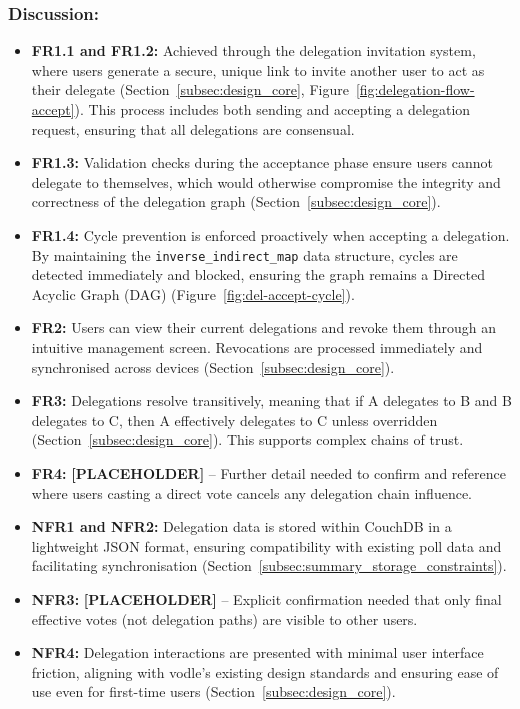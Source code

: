 \subsubsection{Discussion:}

\begin{itemize}
    \item \textbf{FR1.1 and FR1.2:} Achieved through the delegation invitation system, where users generate a secure, unique link to invite another user to act as their delegate (Section~\ref{subsec:design_core}, Figure~\ref{fig:delegation-flow-accept}). This process includes both sending and accepting a delegation request, ensuring that all delegations are consensual.
    \item \textbf{FR1.3:} Validation checks during the acceptance phase ensure users cannot delegate to themselves, which would otherwise compromise the integrity and correctness of the delegation graph (Section~\ref{subsec:design_core}).
    \item \textbf{FR1.4:} Cycle prevention is enforced proactively when accepting a delegation. By maintaining the \texttt{inverse\_indirect\_map} data structure, cycles are detected immediately and blocked, ensuring the graph remains a Directed Acyclic Graph (DAG) (Figure~\ref{fig:del-accept-cycle}).
    \item \textbf{FR2:} Users can view their current delegations and revoke them through an intuitive management screen. Revocations are processed immediately and synchronised across devices (Section~\ref{subsec:design_core}).
    \item \textbf{FR3:} Delegations resolve transitively, meaning that if A delegates to B and B delegates to C, then A effectively delegates to C unless overridden (Section~\ref{subsec:design_core}). This supports complex chains of trust.
    \item \textbf{FR4:} \textbf{[PLACEHOLDER]} -- Further detail needed to confirm and reference where users casting a direct vote cancels any delegation chain influence.
    \item \textbf{NFR1 and NFR2:} Delegation data is stored within CouchDB in a lightweight JSON format, ensuring compatibility with existing poll data and facilitating synchronisation (Section~\ref{subsec:summary_storage_constraints}).
    \item \textbf{NFR3:} \textbf{[PLACEHOLDER]} -- Explicit confirmation needed that only final effective votes (not delegation paths) are visible to other users.
    \item \textbf{NFR4:} Delegation interactions are presented with minimal user interface friction, aligning with vodle's existing design standards and ensuring ease of use even for first-time users (Section~\ref{subsec:design_core}).
\end{itemize}

